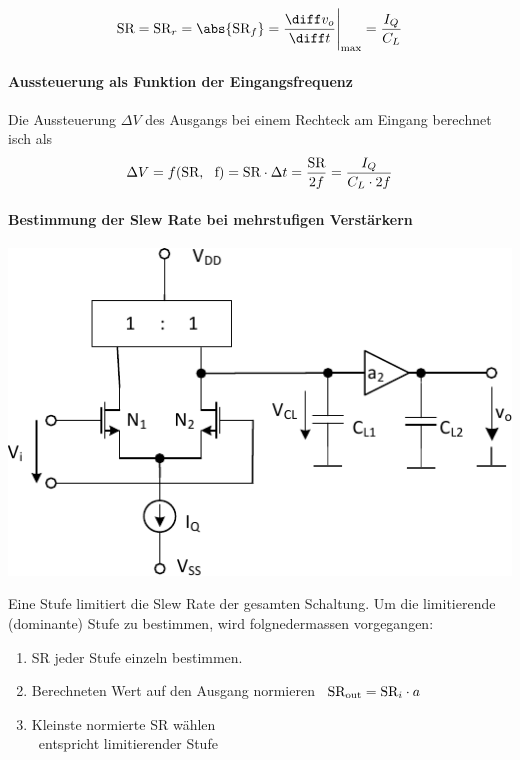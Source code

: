 \[
    \text{SR} = \text{SR}_r = \abs{\text{SR}_f} = \frac{\diff v_o}{\diff t} \Bigg|_{\rm max} = \frac{I_Q}{C_L}
\]
\paragraph{Aussteuerung als Funktion der Eingangsfrequenz}
Die Aussteuerung $\Delta V$ des Ausgangs bei einem Rechteck am Eingang berechnet isch als %
\[
    \Delta V = f(\text{SR, \, f}) = \text{SR} \cdot \Delta t = \frac{\text{SR}}{2 f} = \frac{I_Q}{C_L \cdot 2 f}
\]


\paragraph{Bestimmung der Slew Rate bei mehrstufigen Verstärkern}

\begin{minipage}[t]{0.46\columnwidth}
    \includegraphics[width=\columnwidth, align=t]{images/09_slew_rate.pdf}
\end{minipage}
\hfill
\begin{minipage}[t]{0.5\columnwidth}
    Eine Stufe limitiert die Slew Rate der gesamten Schaltung. 
    Um die limitierende (dominante) Stufe zu bestimmen, wird folgnedermassen vorgegangen:

    \smallskip

    \begin{enumerate}
        \item SR jeder Stufe einzeln bestimmen.
        \item Berechneten Wert auf den Ausgang normieren \textrightarrow\ $\text{SR}_{\rm out} = \text{SR}_i \cdot a$
        \item Kleinste normierte SR wählen \\
            \textrightarrow\ entspricht limitierender Stufe
    \end{enumerate}
\end{minipage}


